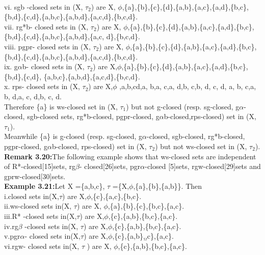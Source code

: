 {{			\\vi.	sgb -closed sets in  (X, $ \tau_{2}$) are X, $\phi$,\{a\},\{b\},\{c\},\{d\},\{a,b\},\{a,c\},\{a,d\},\{b,c\},\{b,d\},\{c,d\},\{a,b,c\},\{a,b,d\},\{a,c,d\},\{b,c,d\}.
			\\vii.	rg*b- closed sets in  (X, $ \tau_{2}$) are X, $\phi$,\{a\},\{b\},\{c\},\{d\},\{a,b\},\{a,c\},\{a,d\},\{b,c\},\{b,d\},\{c,d\},\{a,b,c\},\{a,b,d\},\{a,c, d\},\{b,c,d\}.
			\\viii.	pgpr- closed sets in  (X, $ \tau_{2}$) are X, $\phi$,\{a\},\{b\},\{c\},\{d\},\{a,b\},\{a,c\},\{a,d\},\{b,c\},\{b,d\},\{c,d\},\{a,b,c\},\{a,b,d\},\{a,c,d\},\{b,c,d\}.
			\\ix.	g$\alpha$b- closed sets in  (X, $ \tau_{2}$) are X,$\phi$,\{a\},\{b\},\{c\},\{d\},\{a,b\},\{a,c\},\{a,d\},\{b,c\},\{b,d\},\{c,d\}, \{a,b,c\},\{a,b,d\},\{a,c,d\},\{b,c,d\}.
			\\x.	rps- closed sets in  (X, $ \tau_{2}$) are X,$\phi$ ,{a},{b},{c}{d},{a, b},{a, c},{a, d},{b, c},{b, d}, {c, d}, {a, b, c},{a, b, d},{a, c, d},{b, c, d}.
			\\\indent Therefore \{a\} is ws-closed set in (X, $ \tau_{1}$) but not g-closed (resp. sg-closed, g$\alpha$-closed, sgb-closed sets, rg*b-closed, pgpr-closed, g$\alpha$b-closed,rps-closed) set in (X,  $ \tau_{1}$).
			\\\indent Meanwhile \{a\} is g-closed (resp.  sg-closed, g$\alpha$-closed, sgb-closed, rg*b-closed, pgpr-closed, g$\alpha$b-closed, rps-closed) set in (X,  $ \tau_{2}$) but not ws-closed set in (X, $ \tau_{2}$).
			\\\textbf{Remark 3.20:}The following example shows that ws-closed sets are independent of R*-closed[15]sets, rg$\beta$- closed[26]sets, pgr$\alpha$-closed [5]sets, rgw-closed[29]sets and gprw-closed[30]sets.
			\\\textbf{Example 3.21:}Let X =\{a,b,c\},  $\tau$ =\{X,$\phi$,\{a\},\{b\},\{a,b\}\}. Then
			\\i.closed sets in(X,$\tau$) are X,$\phi$,\{c\},\{a,c\},\{b,c\}.
			\\ii.ws-closed sets in(X, $\tau$) are X, $\phi$,\{a\},\{b\},\{c\},\{b,c\},\{a,c\}.
			\\iii.R* -closed sets in(X,$\tau$) are X,$\phi$,\{c\},\{a,b\},\{b,c\},\{a,c\}.
			\\iv.rg$\beta$ -closed sets in(X, $\tau$) are X,$\phi$,\{c\},\{a,b\},\{b,c\},\{a,c\}.
			\\v.pgr$\alpha$- closed sets in(X,$\tau$) are X,$\phi$,\{c\},\{a,b\},{\b,c\},\{a,c\}.
				\\vi.rgw- closed sets in(X, $\tau$ ) are X, $\phi$,\{c\},\{a,b\},\{b,c\},\{a,c\}.
}}}
